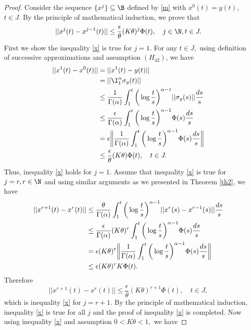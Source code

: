 \begin{proof}
Consider the sequence $\{x^{j}\}\subseteq\B$ defined by \eqref{m} with $x^0(t)=y(t)$, $t\in{J}.$ By the principle of mathematical induction, we prove that
\begin{equation}\label{x}
||x^j(t)-x^{j-1}(t)||\leq\frac{\epsilon}{\theta}(K\theta)^{j}\Phi(t),\quad j\in\N,t\in{J}.
\end{equation}
First we show the inequality \eqref{x} is true for $j=1.$ For any $t\in{J},$ using definition of successive approximations and assumption $(H_{42})$, we have
\begin{align*}
||x^{1}(t)-x^{0}(t)||&=||x^{1}(t)-y(t)||\\
&=||\I_{1}^{\alpha}\sigma_y(t)||\\
&\leq\frac{1}{\Gamma(\alpha)}\int_{1}^{t}\bigg(\log{\frac{t}{s}}\bigg)^{\alpha-1}||\sigma_y(s)||\frac{ds}{s}\\
&\leq\frac{\epsilon}{\Gamma(\alpha)}\int_{1}^{t}\bigg(\log{\frac{t}{s}}\bigg)^{\alpha-1}\Phi(s)\frac{ds}{s}\\
&=\epsilon\bigg{\|}\frac{1}{\Gamma(\alpha)}\int_{1}^{t}\bigg(\log{\frac{t}{s}}\bigg)^{\alpha-1}\Phi(s)\frac{ds}{s}\bigg{\|}\\
&\leq\frac{\epsilon}{\theta} (K\theta)\Phi(t),\quad t\in{J}.
\end{align*}
Thus, inequality \eqref{x} holds for $j=1.$ Assume that inequality \eqref{x} is true for $j=r,r\in\N$ and using similar arguments as we presented in Theorem \ref{th2}, we have
\begin{align*}
||x^{r+1}(t)-x^{r}(t)||&\leq\frac{\theta}{\Gamma(\alpha)}\int_{1}^{t}\bigg(\log{\frac{t}{s}}\bigg)^{\alpha-1}||x^{r}(s)-x^{r-1}(s)||\frac{ds}{s}\\
&\leq\frac{\epsilon}{\Gamma(\alpha)}(K\theta)^r\int_{1}^{t}\bigg(\log{\frac{t}{s}}\bigg)^{\alpha-1}\Phi(s)\frac{ds}{s}\\
&=\epsilon(K\theta)^r\bigg{\|}\frac{1}{\Gamma(\alpha)}\int_{1}^{t}\bigg(\log{\frac{t}{s}}\bigg)^{\alpha-1}\Phi(s)\frac{ds}{s}\bigg{\|}\\
&\leq\epsilon(K\theta)^rK\Phi(t).
\end{align*}
Therefore
\begin{equation*}
||x^{r+1}(t)-x^{r}(t)||\leq\frac{\epsilon}{\theta}(K\theta)^{r+1}\Phi(t),\quad t\in{J},
\end{equation*}
which is inequality \eqref{x} for $j=r+1.$ By the principle of mathematical induction, inequality \eqref{x} is true for all $j$ and the proof of inequality \eqref{x} is completed. Now using inequality \eqref{x} and assumption $0<K\theta<1,$ we have

\end{proof}
